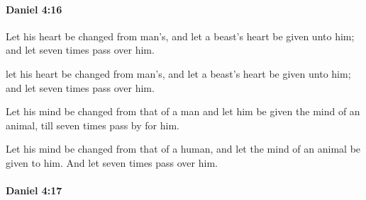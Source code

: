 		\paragraph{Daniel 4:16} %
			\label{DANIEL-4-16}

			Let his heart be changed from man’s, and let a beast’s heart be given unto him; and let seven times pass over him.

			\begin{versebox}
					\item[BHS] 
					\item[LXX] 
					\item[ASV] let his heart be changed from man's, and let a beast's heart be given unto him; and let seven times pass over him.
					\item[NIV] Let his mind be changed from that of a man and let him be given the mind of an animal, till seven times pass by for him.
					\item[NRSV] Let his mind be changed from that of a human, and let the mind of an animal be given to him. And let seven times pass over him.
			\end{versebox}

		\paragraph{Daniel 4:17} %
			\label{DANIEL-4-17}

